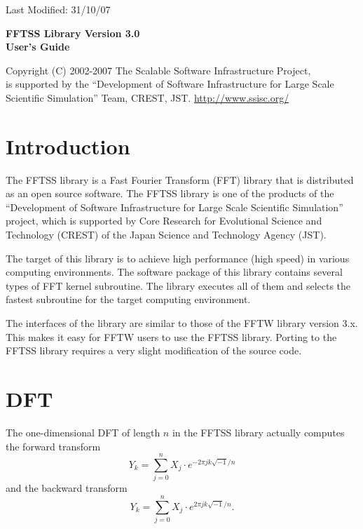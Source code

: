\documentclass{article}
\begin{document}
\pagestyle{plain}
\hfill{\large Last Modified: 31/10/07}
\vspace{9cm}
\begin{center}
{\Huge \bf FFTSS Library Version 3.0\\User's Guide}
\end{center}
\vspace{8cm}
{\large Copyright (C) 2002-2007 The Scalable Software Infrastructure Project,\\
is supported by the ``Development of Software Infrastructure for Large Scale Scientific Simulation'' Team, CREST, JST. \href{http://www.ssisc.org/}{http://www.ssisc.org/}}

\pagestyle{empty}
\newpage
\tableofcontents
\newpage
\section{Introduction}
The FFTSS library is a Fast Fourier Transform (FFT) library that is distributed as
an open source software. The FFTSS library is one of the products of the
``Development of Software Infrastructure for Large Scale Scientific Simulation''
project, which is supported by
Core Research for Evolutional Science and Technology (CREST) of
the Japan Science and Technology Agency (JST).

The target of this library is to achieve high performance (high speed) in
various computing environments. The software package of this library contains
several types of FFT kernel subroutine. The library executes all of them 
 and selects the fastest subroutine for the target computing environment.

The interfaces of the library are
similar to those of the FFTW library version 3.x. This makes it easy
for FFTW users to use the FFTSS library. 
Porting to the FFTSS library requires a very slight modification
 of the source code.

\section{DFT}

The one-dimensional DFT of length $n$ in the FFTSS library 
actually computes\\
the forward transform\\
\[Y_k = \sum_{j=0}^n X_j\cdot e^{-2\pi jk\sqrt{-1}/n}\]
and the backward transform\\
\[Y_k = \sum_{j=0}^n X_j\cdot e^{2\pi jk\sqrt{-1}/n}.\]
\end{document}
